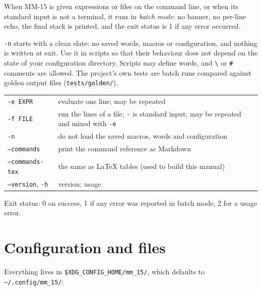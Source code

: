 \documentclass[11pt,letterpaper]{article}
\newcommand{\code}[1]{\texttt{#1}}
\begin{document}
When MM-15 is given expressions or files on the command line, or when its standard input is not a terminal, it runs in \emph{batch mode}: no banner, no per-line echo, the final stack is printed, and the exit status is 1 if any error occurred.
\code{-n} starts with a clean slate: no saved words, macros or configuration, and nothing is written at exit. Use it in scripts so that their behaviour does not depend on the state of your configuration directory. Scripts may define words, and \code{\textbackslash} or \code{\#} comments are allowed. The project's own tests are batch runs compared against golden output files (\code{tests/golden/}).

\begin{center}
\begin{tabular}{@{}lp{}@{}}
\toprule
\code{-e EXPR} & evaluate one line; may be repeated \\
\code{-f FILE} & run the lines of a file; \code{-} is standard input; may be repeated and mixed with \code{-e} \\
\code{-n}      & do not load the saved macros, words and configuration \\
\code{--commands} & print the command reference as Markdown \\
\code{--commands-tex} & the same as LaTeX tables (used to build this manual) \\
\code{--version}, \code{-h} & version; usage \\
\bottomrule
\end{tabular}
\end{center}
Exit status: 0 on success, 1 if any error was reported in batch mode, 2 for a usage error.

\section{Configuration and files}

Everything lives in \code{\$XDG\_CONFIG\_HOME/mm\_15/}, which defaults to \code{\textasciitilde/.config/mm\_15/}:
\end{document}
